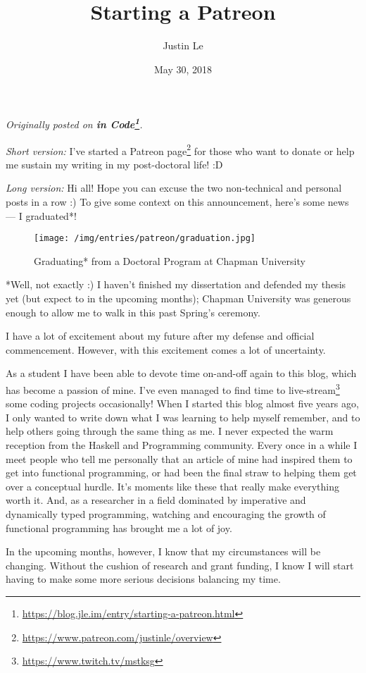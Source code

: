 \documentclass[]{article}
\title{Starting a Patreon}
\author{Justin Le}
\date{May 30, 2018}
\renewcommand{\href}[2]{#2\footnote{\url{#1}}}
\begin{document}
\maketitle

\emph{Originally posted on
\textbf{\href{https://blog.jle.im/entry/starting-a-patreon.html}{in Code}}.}

\emph{Short version:} I've
\href{https://www.patreon.com/justinle/overview}{started a Patreon page} for
those who want to donate or help me sustain my writing in my post-doctoral life!
:D

\emph{Long version:} Hi all! Hope you can excuse the two non-technical and
personal posts in a row :) To give some context on this announcement, here's
some news --- I graduated*!

\begin{figure}
\centering
\texttt{[image: /img/entries/patreon/graduation.jpg]}
\caption{Graduating* from a Doctoral Program at Chapman University}
\end{figure}

*Well, not exactly :) I haven't finished my dissertation and defended my thesis
yet (but expect to in the upcoming months); Chapman University was generous
enough to allow me to walk in this past Spring's ceremony.

I have a lot of excitement about my future after my defense and official
commencement. However, with this excitement comes a lot of uncertainty.

As a student I have been able to devote time on-and-off again to this blog,
which has become a passion of mine. I've even managed to find time to
\href{https://www.twitch.tv/mstksg}{live-stream} some coding projects
occasionally! When I started this blog almost five years ago, I only wanted to
write down what I was learning to help myself remember, and to help others going
through the same thing as me. I never expected the warm reception from the
Haskell and Programming community. Every once in a while I meet people who tell
me personally that an article of mine had inspired them to get into functional
programming, or had been the final straw to helping them get over a conceptual
hurdle. It's moments like these that really make everything worth it. And, as a
researcher in a field dominated by imperative and dynamically typed programming,
watching and encouraging the growth of functional programming has brought me a
lot of joy.

In the upcoming months, however, I know that my circumstances will be changing.
Without the cushion of research and grant funding, I know I will start having to
make some more serious decisions balancing my time.
\end{document}
